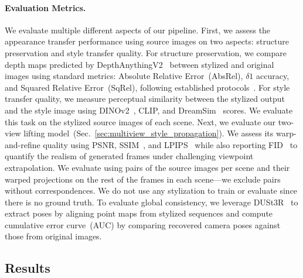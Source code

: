 \paragraph{\bf{Evaluation Metrics.}}
We evaluate multiple different aspects of our pipeline.
First, we assess the appearance transfer performance using source images on two aspects: structure preservation and style transfer quality.
For structure preservation, we compare depth maps predicted by DepthAnythingV2~\cite{yang2024depth} between stylized and original images using standard metrics: Absolute Relative Error~(AbsRel), $\delta1$ accuracy, and Squared Relative Error~(SqRel), following established protocols~\cite{ke2023marigold, yang2024depth}.
For style transfer quality, we measure perceptual similarity between the stylized output and the style image using DINOv2~\cite{oquab2023dinov2}, CLIP, and DreamSim~\cite{fu2023dreamsim} scores. We evaluate this task on the stylized source images of each scene.
Next, we evaluate our two-view lifting model~(Sec.~\ref{sec:multiview_style_propagation}).
We assess its warp-and-refine quality using PSNR, SSIM~\cite{zhou2004ssim}, and LPIPS~\cite{zhang2018lpips} while also reporting FID~\cite{martin2017fid} to quantify the realism of generated frames under challenging viewpoint extrapolation. We evaluate using pairs of the source images per scene and their warped projections on the rest of the frames in each scene---we exclude pairs without correspondences. We do not use any stylization to train or evaluate since there is no ground truth.
To evaluate global consistency, we leverage DUSt3R~\cite{wang2024dust3r} to extract poses by aligning point maps from stylized sequences and compute cumulative error curve~(AUC) by comparing recovered camera poses against those from original images.





\subsection{Results}
